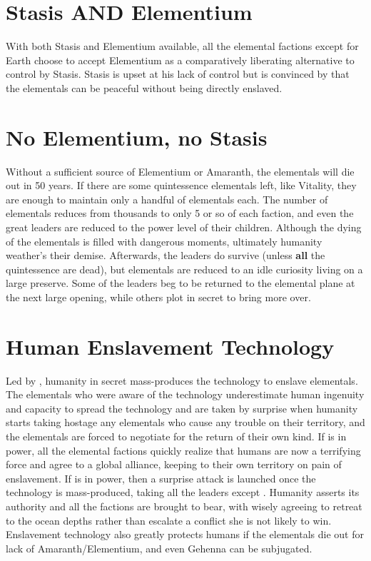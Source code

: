 \documentclass[green]{elementals}
\begin{document}
\section{Stasis AND Elementium}

With both Stasis and Elementium available, all the elemental factions except for Earth choose to accept Elementium as a comparatively liberating alternative to control by Stasis. Stasis is upset at his lack of control but is convinced by \cAvatar{\intro} that the elementals can be peaceful without being directly enslaved.

\section{No Elementium, no Stasis}

Without a sufficient source of Elementium or Amaranth, the elementals will die out in 50 years. If there are some quintessence elementals left, like Vitality, they are enough to maintain only a handful of elementals each. The number of elementals reduces from thousands to only 5 or so of each faction, and even the great leaders are reduced to the power level of their children. Although the dying of the elementals is filled with dangerous moments, ultimately humanity weather's their demise. Afterwards, the leaders do survive (unless \textbf{all} the quintessence are dead), but elementals are reduced to an idle curiosity living on a large preserve. Some of the leaders beg to be returned to the elemental plane at the next large opening, while others plot in secret to bring more over.

\section{Human Enslavement Technology}

Led by \cMS{\intro}, humanity in secret mass-produces the technology to enslave elementals. The elementals who were aware of the technology underestimate human ingenuity and capacity to spread the technology and are taken by surprise when humanity starts taking hostage any elementals who cause any trouble on their territory, and the elementals are forced to negotiate for the return of their own kind. If \cLeader{\intro} is in power, all the elemental factions quickly realize that humans are now a terrifying force and agree to a global alliance, keeping to their own territory on pain of enslavement. If \cDema{\intro} is in power, then a surprise attack is launched once the technology is mass-produced, taking all the leaders except \cWaterQueen{}. Humanity asserts its authority and all the factions are brought to bear, with \cWaterQueen{} wisely agreeing to retreat to the ocean depths rather than escalate a conflict she is not likely to win. Enslavement technology also greatly protects humans if the elementals die out for lack of Amaranth/Elementium, and even Gehenna can be subjugated.
\end{document}
